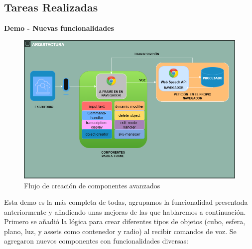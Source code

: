 \documentclass[a4paper, 12pt]{book}
\begin{document}
\subsection{Tareas Realizadas}
\textbf{Demo - Nuevas funcionalidades}

\begin{figure}[H]  %
  \centering
  \includegraphics[width=0.6\linewidth]{img/componentes4.png}  %
  \caption{Flujo de creación de componentes avanzados}  %
  \label{fig:componente4}  %
\end{figure} 
Esta demo es la más completa de todas, agrupamos la funcionalidad presentada anteriormente y añadiendo unas mejoras de las que hablaremos a continuación.
Primero se añadió la lógica para crear diferentes tipos de objetos (cubo, esfera, plano, luz, y assets como contenedor y radio) al recibir comandos de voz.
Se agregaron nuevos componentes con funcionalidades diversas:
\end{document}
